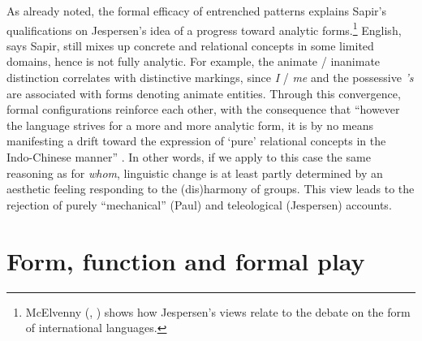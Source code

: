\documentclass[output=paper]{langscibook}
\begin{document}
As already noted, the formal efficacy of entrenched patterns explains Sapir's qualifications on Jespersen's idea of a progress toward analytic forms.\footnote{McElvenny (\citeyear{McElvenny2013}, \citeyear{McElvenny2017b}) shows how Jespersen's views relate to the debate on the form of international languages.} English, says Sapir, still mixes up concrete and relational concepts in some limited domains, hence is not fully analytic. For example, the animate / inanimate distinction correlates with distinctive markings, since \emph{I} / \emph{me} and the possessive \emph{'s} are associated with forms denoting animate entities. Through this convergence, formal configurations reinforce each other, with the consequence that ``however the language strives for a more and more analytic form, it is by no means manifesting a drift toward the expression of `pure' relational concepts in the Indo-Chinese manner'' \citep[168]{Sapir1921}. In other words, if we apply to this case the same reasoning as for \emph{whom}, linguistic change is at least partly determined by an aesthetic feeling responding to the (dis)harmony of groups. This view leads to the rejection of purely ``mechanical'' (Paul) and teleological (Jespersen) accounts.

\section{Form, function and formal play}
\label{sec:fortis:formalplay}
\end{document}
